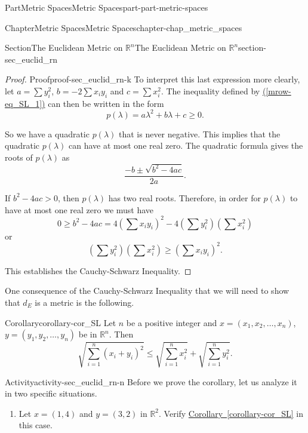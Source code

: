 \documentclass[oneside,10pt,]{book}
\newcommand{\xreffont}{\relax}
\numberwithin{equation}{chapter}
\newcommand{\R}{\mathbb{R}}
\newcommand{\gt}{>}
\begin{document}
\begin{partptx}{Part}{Metric Spaces}{}{Metric Spaces}{}{}{part-part-metric-spaces}
\begin{chapterptx}{Chapter}{Metric Spaces}{}{Metric Spaces}{}{}{chapter-chap_metric_spaces}
\begin{sectionptx}{Section}{The Euclidean Metric on \(\R^n\)}{}{The Euclidean Metric on \(\R^n\)}{}{}{section-sec_euclid_rn}
\begin{proof}{Proof}{}{proof-sec_euclid_rn-k}
To interpret this last expression more clearly, let \(a=\sum y_i^2\), \(b=-2\sum x_iy_i\) and \(c = \sum x_i^2\). The inequality defined by \hyperref[mrow-eq_SL_1]{({\xreffont\ref{mrow-eq_SL_1}})} can then be written in the form%
\begin{equation*}
p(\lambda) = a \lambda^2 + b \lambda + c \geq 0\text{.}
\end{equation*}
%
\par
So we have a quadratic \(p(\lambda)\) that is never negative. This implies that the quadratic \(p(\lambda)\) can have at most one real zero. The quadratic formula gives the roots of \(p(\lambda)\) as%
\begin{equation*}
\frac{-b \pm \sqrt{b^2-4ac}}{2a}\text{.}
\end{equation*}
%
\par
If \(b^2-4ac \gt 0\), then \(p(\lambda)\) has two real roots. Therefore, in order for \(p(\lambda)\) to have at most one real zero we must have%
\begin{equation*}
0 \geq b^2-4ac = 4 \left(\sum x_iy_i\right)^2 - 4\left(\sum y_i^2\right)\left(\sum x_i^2\right)
\end{equation*}
or%
\begin{equation*}
\left(\sum y_i^2\right)\left(\sum x_i^2\right) \geq \left(\sum x_iy_i\right)^2\text{.}
\end{equation*}
%
\par
This establishes the Cauchy-Schwarz Inequality.%
\end{proof}
One consequence of the Cauchy-Schwarz Inequality that we will need to show that \(d_E\) is a metric is the following.%
\begin{corollary}{Corollary}{}{}{corollary-cor_SL}%
Let \(n\) be a positive integer and \(x = (x_1, x_2, \ldots,
x_n)\), \(y=(y_1, y_2, \ldots, y_n)\) be in \(\R^n\). Then%
\begin{equation*}
\sqrt{\sum_{i=1}^n (x_i+y_i)^2} \leq \sqrt{\sum_{i=1}^n x_i^2} + \sqrt{\sum_{i=1}^n y_i^2}\text{.}
\end{equation*}
%
\end{corollary}
\begin{activity}{Activity}{}{activity-sec_euclid_rn-n}%
Before we prove the corollary, let us analyze it in two specific situations.%
\begin{enumerate}[font=\bfseries,label=(\alph*),ref=\alph*]%
\item{}Let \(x=(1,4)\) and \(y = (3,2)\) in \(\R^2\). Verify \hyperref[corollary-cor_SL]{Corollary~{\xreffont\ref{corollary-cor_SL}}} in this case.%

\end{enumerate}
\end{activity}
\end{sectionptx}
\end{chapterptx}
\end{partptx}
\end{document}
